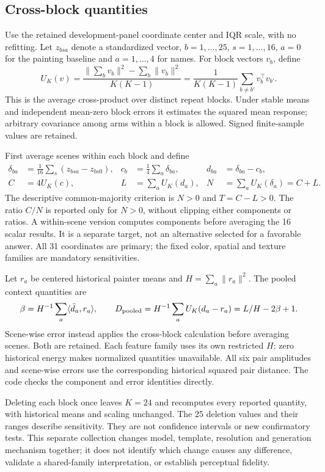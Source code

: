 \subsection{Cross-block quantities}
Use the retained development-panel coordinate center and IQR scale, with no
refitting. Let $z_{bsa}$ denote a standardized vector, $b=1,\ldots,25$,
$s=1,\ldots,16$, $a=0$ for the painting baseline and $a=1,\ldots,4$ for names.
For block vectors $v_b$, define
\begin{equation}
 U_K(v)=\frac{\|\sum_b v_b\|^2-\sum_b\|v_b\|^2}{K(K-1)}
       =\frac{1}{K(K-1)}\sum_{b\ne b'}v_b^\top v_{b'}.
\end{equation}
This is the average cross-product over distinct repeat blocks. Under stable
means and independent mean-zero block errors it estimates the squared mean
response; arbitrary covariance among arms within a block is allowed.
Signed finite-sample values are retained.

First average scenes within each block and define
\begin{align}
 \delta_{ba}&=\tfrac1{16}\sum_s(z_{bsa}-z_{bs0}),&
 c_b&=\tfrac14\sum_a\delta_{ba},& d_{ba}&=\delta_{ba}-c_b,\\
 C&=4U_K(c),& L&=\sum_a U_K(d_a),& N&=\sum_a U_K(\delta_a)=C+L.
\end{align}
The descriptive common-majority criterion is $N>0$ and $T=C-L>0$.
The ratio $C/N$ is reported only for $N>0$, without clipping either components
or ratios. A within-scene version computes components before averaging the
16 scalar results. It is a separate target, not an alternative selected for
a favorable answer. All 31 coordinates are primary; the fixed color, spatial
and texture families are mandatory sensitivities.

Let $r_a$ be centered historical painter means and $H=\sum_a\|r_a\|^2$.
The pooled context quantities are
\begin{equation}
 \beta=H^{-1}\sum_a\langle\bar d_a,r_a\rangle,\qquad
 D_{\rm pooled}=H^{-1}\sum_a U_K(d_a-r_a)
              =L/H-2\beta+1.
\end{equation}
Scene-wise error instead applies the cross-block calculation before averaging
scenes. Both are retained. Each feature family uses its own restricted $H$;
zero historical energy makes normalized quantities unavailable. All six pair
amplitudes and scene-wise errors use the corresponding historical squared
pair distance. The code checks the component and error identities directly.

Deleting each block once leaves $K=24$ and recomputes every reported quantity,
with historical means and scaling unchanged. The 25 deletion values and their
ranges describe sensitivity. They are not confidence intervals or new
confirmatory tests. This separate collection changes model, template,
resolution and generation mechanism together; it does not identify which
change causes any difference, validate a shared-family interpretation, or
establish perceptual fidelity.
